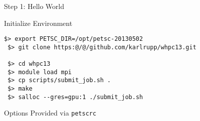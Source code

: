 



\begin{frame}[fragile]{Step 1: Hello World}

   \begin{block}{Initialize Environment}
    \begin{lstlisting}[escapechar=@]
 $> export PETSC_DIR=/opt/petsc-20130502
 $> git clone https:@/@/github.com/karlrupp/whpc13.git

 $> cd whpc13
 $> module load mpi
 $> cp scripts/submit_job.sh .
 $> make
 $> salloc --gres=gpu:1 ./submit_job.sh
    \end{lstlisting}
   \end{block}

   \begin{block}{Options}
     Provided via \lstinline|petscrc|
   \end{block}


\end{frame}


